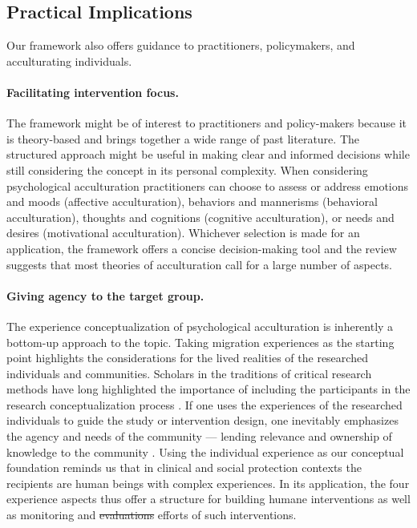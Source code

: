\documentclass[man, 12pt, a4paper, mask]{apa7}
\providecommand{\DIFaddtex}[1]{{\protect\color{blue}\uwave{#1}}} %
\providecommand{\DIFdeltex}[1]{{\protect\color{red}\sout{#1}}}                      %
\providecommand{\DIFaddbegin}{} %
\providecommand{\DIFaddend}{} %
\providecommand{\DIFdelbegin}{} %
\providecommand{\DIFdelend}{} %
\providecommand{\DIFadd}[1]{\texorpdfstring{\DIFaddtex{#1}}{#1}} %
\providecommand{\DIFdel}[1]{\texorpdfstring{\DIFdeltex{#1}}{}} %
\newcommand{\DIFscaledelfig}{0.5}
\newlength{\DIFdelgraphicswidth} %
\newlength{\DIFdelgraphicsheight} %
\newcommand{\DIFaddincludegraphics}[2][]{{\color{blue}\fbox{\DIFOincludegraphics[#1]{#2}}}} %
\newcommand{\DIFdelincludegraphics}[2][]{%
\sbox{\DIFdelgraphicsbox}{\DIFOincludegraphics[#1]{#2}}%
\settoboxwidth{\DIFdelgraphicswidth}{\DIFdelgraphicsbox} %
\settoboxtotalheight{\DIFdelgraphicsheight}{\DIFdelgraphicsbox} %
\scalebox{\DIFscaledelfig}{%
\parbox[b]{\DIFdelgraphicswidth}{\usebox{\DIFdelgraphicsbox}\\[-\baselineskip] \rule{\DIFdelgraphicswidth}{0em}}\llap{\resizebox{\DIFdelgraphicswidth}{\DIFdelgraphicsheight}{%
\setlength{\unitlength}{\DIFdelgraphicswidth}%
\begin{picture}(1,1)%
\thicklines\linethickness{2pt} %
{\color[rgb]{1,0,0}\put(0,0){\framebox(1,1){}}}%
{\color[rgb]{1,0,0}\put(0,0){\line( 1,1){1}}}%
{\color[rgb]{1,0,0}\put(0,1){\line(1,-1){1}}}%
\end{picture}%
}\hspace*{3pt}}} %
} %
\DeclareRobustCommand{\DIFaddbegin}{\DIFOaddbegin \let\includegraphics\DIFaddincludegraphics} %
\DeclareRobustCommand{\DIFaddend}{\DIFOaddend \let\includegraphics\DIFOincludegraphics} %
\DeclareRobustCommand{\DIFdelbegin}{\DIFOdelbegin \let\includegraphics\DIFdelincludegraphics} %
\DeclareRobustCommand{\DIFdelend}{\DIFOaddend \let\includegraphics\DIFOincludegraphics} %
\begin{document}
\DIFaddend \subsection{Practical Implications}
Our framework also offers guidance to practitioners, policymakers, and acculturating individuals. 

\paragraph{Facilitating intervention focus.} The framework might be of interest to practitioners and policy-makers because it is theory-based and brings together a wide range of past literature. The structured approach might be useful in making clear and informed decisions while still considering the concept in its personal complexity. When considering psychological acculturation practitioners can choose to assess or address emotions and moods (affective acculturation), behaviors and mannerisms (behavioral acculturation), thoughts and cognitions (cognitive acculturation), or needs and desires (motivational acculturation). Whichever selection is made for an application, the framework offers a concise decision-making tool and the review suggests that most theories of acculturation call for a large number of aspects.

\paragraph{Giving agency to the target group.} The experience conceptualization of psychological acculturation is inherently a bottom-up approach to the topic. Taking migration experiences as the starting point highlights the considerations for the lived realities of the researched individuals and communities. Scholars in the traditions of critical research methods have long highlighted the importance of including the participants in the research conceptualization process \citep[e.g.,][]{Kovach2009}. If one uses the experiences of the researched individuals to guide the study or intervention design, one inevitably emphasizes the agency and needs of the community --- lending relevance and ownership of knowledge to the community \citep[e.g., ][]{Schmidt2021}. Using the individual experience as our conceptual foundation reminds us that in clinical and social protection contexts the recipients are human beings with complex experiences. In its application, the four experience aspects thus offer a structure for building humane interventions as well as monitoring and \DIFdelbegin \DIFdel{evaluations }\DIFdelend \DIFaddbegin \DIFadd{evaluation }\DIFaddend efforts of such interventions. 
\end{document}
